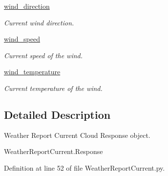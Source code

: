 \begin{DoxyCompactItemize}
\hyperlink{classRappCloud_1_1CloudMsgs_1_1WeatherReportCurrent_1_1WeatherReportCurrent_1_1Response_aa904e9f235ca25399e954292ba897e97}{wind\-\_\-direction}
\begin{DoxyCompactList}\small\item\em Current wind direction. \end{DoxyCompactList}\item 
\hyperlink{classRappCloud_1_1CloudMsgs_1_1WeatherReportCurrent_1_1WeatherReportCurrent_1_1Response_a1d01988ef1a2203a5e11611ea384af8c}{wind\-\_\-speed}
\begin{DoxyCompactList}\small\item\em Current speed of the wind. \end{DoxyCompactList}\item 
\hyperlink{classRappCloud_1_1CloudMsgs_1_1WeatherReportCurrent_1_1WeatherReportCurrent_1_1Response_a3d3756623086d21e4c638cbcc9a18c63}{wind\-\_\-temperature}
\begin{DoxyCompactList}\small\item\em Current temperature of the wind. \end{DoxyCompactList}\end{DoxyCompactItemize}


\subsection{Detailed Description}
\begin{DoxyVerb}Weather Report Current Cloud Response object.

WeatherReportCurrent.Response
\end{DoxyVerb}
 

Definition at line 52 of file Weather\-Report\-Current.\-py.



